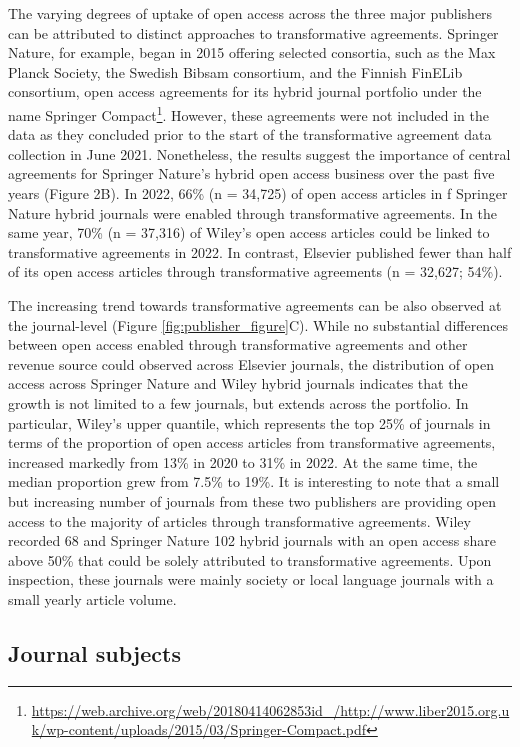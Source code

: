 \documentclass[a4paper,man,floatsintext,longtable,noextraspace,12pt]{apa6}
\begin{document}
The varying degrees of uptake of open access across the three major
publishers can be attributed to distinct approaches to transformative
agreements. Springer Nature, for example, began in 2015 offering
selected consortia, such as the Max Planck Society, the Swedish Bibsam
consortium, and the Finnish FinELib consortium, open access agreements
for its hybrid journal portfolio under the name Springer
Compact\footnote{\url{https://web.archive.org/web/20180414062853id_/http://www.liber2015.org.uk/wp-content/uploads/2015/03/Springer-Compact.pdf}}.
However, these agreements were not included in the data as they
concluded prior to the start of the transformative agreement data
collection in June 2021. Nonetheless, the results suggest the importance
of central agreements for Springer Nature's hybrid open access business
over the past five years (Figure 2B). In 2022, 66\% (n = 34,725) of open
access articles in f Springer Nature hybrid journals were enabled
through transformative agreements. In the same year, 70\% (n = 37,316)
of Wiley's open access articles could be linked to transformative
agreements in 2022. In contrast, Elsevier published fewer than half of
its open access articles through transformative agreements (n = 32,627;
54\%).

The increasing trend towards transformative agreements can be also
observed at the journal-level (Figure \ref{fig:publisher_figure}C).
While no substantial differences between open access enabled through
transformative agreements and other revenue source could observed across
Elsevier journals, the distribution of open access across Springer
Nature and Wiley hybrid journals indicates that the growth is not
limited to a few journals, but extends across the portfolio. In
particular, Wiley's upper quantile, which represents the top 25\% of
journals in terms of the proportion of open access articles from
transformative agreements, increased markedly from 13\% in 2020 to 31\%
in 2022. At the same time, the median proportion grew from 7.5\% to
19\%. It is interesting to note that a small but increasing number of
journals from these two publishers are providing open access to the
majority of articles through transformative agreements. Wiley recorded
68 and Springer Nature 102 hybrid journals with an open access share
above 50\% that could be solely attributed to transformative agreements.
Upon inspection, these journals were mainly society or local language
journals with a small yearly article volume.

\hypertarget{journal-subjects}{%
\subsection{Journal subjects}\label{journal-subjects}}
\end{document}

